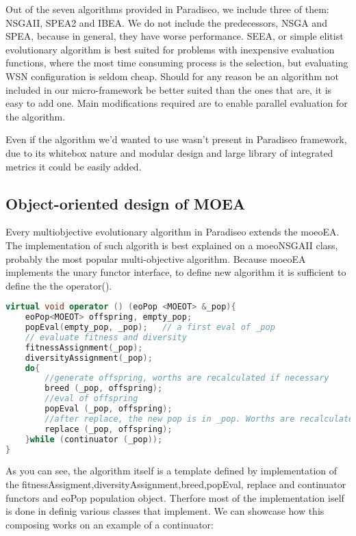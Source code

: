 \documentclass[12pt,oneside]{fithesis2}
\begin{document}
Out of the seven algorithms provided in Paradiseo, we include three of them: NSGAII, SPEA2 and IBEA. We do not include the predecessors, NSGA and SPEA, because in general, they have worse performance. SEEA, or simple elitist evolutionary algorithm is best suited for problems with inexpensive evaluation functions, where the most time consuming process is the selection, but evaluating WSN configuration is seldom cheap. Should for any reason be an algorithm not included in our micro-framework be better suited than the ones that are, it is easy to add one. Main modifications required are to enable parallel evaluation for the algorithm.

Even if the algorithm we'd wanted to use wasn't present in Paradiseo framework, due to its whitebox nature and modular design and large library of integrated metrics it could be easily added.

\subsection{Object-oriented design of MOEA}

Every multiobjective evolutionary algorithm in Paradiseo extends the moeoEA. 
The implementation of such algorith is best explained on a  moeoNSGAII class, probably the most popular multi-objective algorithm. 
Because moeoEA implements the unary functor interface, to define new algorithm it is sufficient to define the the operator().

\begin{lstlisting}[language=C++,label=evolution,caption=NSGAII algorithm in Paradiseo]
virtual void operator () (eoPop <MOEOT> &_pop){
    eoPop<MOEOT> offspring, empty_pop;
    popEval(empty_pop, _pop);	// a first eval of _pop
    // evaluate fitness and diversity
    fitnessAssignment(_pop);
    diversityAssignment(_pop);
    do{
        //generate offspring, worths are recalculated if necessary
        breed (_pop, offspring);
        //eval of offspring
        popEval (_pop, offspring);
        //after replace, the new pop is in _pop. Worths are recalculated if necessary
        replace (_pop, offspring);
    }while (continuator (_pop));
}
\end{lstlisting}

As you can see, the algorithm itself is a template defined by implementation of the fitnessAssigment,diversityAssignment,breed,popEval, replace and continuator functors and eoPop population object. Therfore most of the implementation iself is done in definig various classes that implement. We can showcase how this composing works on an example of a continuator:
\end{document}
